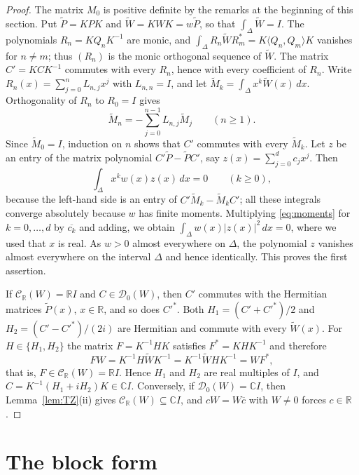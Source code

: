 \documentclass[11pt]{amsart}
\theoremstyle{definition}
\theoremstyle{remark}
\numberwithin{equation}{section}
\newcommand{\C}{\mathbb{C}}
\newcommand{\R}{\mathbb{R}}
\newcommand{\cD}{\mathcal{D}}
\newcommand{\CR}{\mathcal{C}_{\R}}
\newcommand{\ip}[2]{\langle #1,#2\rangle}
\newcommand{\conj}[1]{\overline{#1}}
\begin{document}
\begin{proof}
The matrix $M_0$ is positive definite by the remarks at the beginning of
this section. Put $\widetilde P=KPK$ and $\widetilde W=KWK=w\widetilde P$,
so that $\int_\Delta\widetilde W=I$. The polynomials
$R_n=KQ_nK^{-1}$ are monic, and
$\int_\Delta R_n\widetilde WR_m^*=K\ip{Q_n}{Q_m}K$ vanishes for $n\ne m$;
thus $(R_n)$ is the monic orthogonal sequence of $\widetilde W$. The matrix
$C'=KCK^{-1}$ commutes with every $R_n$, hence with every coefficient of
$R_n$. Write $R_n(x)=\sum_{j=0}^nL_{n,j}x^j$ with $L_{n,n}=I$, and let
$\widetilde M_k=\int_\Delta x^k\widetilde W(x)\,dx$. Orthogonality of $R_n$
to $R_0=I$ gives
\[
\widetilde M_n=-\sum_{j=0}^{n-1}L_{n,j}\widetilde M_j\qquad(n\ge1).
\]
Since $\widetilde M_0=I$, induction on $n$ shows that $C'$ commutes with
every $\widetilde M_k$. Let $z$ be an entry of the matrix polynomial
$C'\widetilde P-\widetilde PC'$, say $z(x)=\sum_{j=0}^dc_jx^j$. Then
\begin{equation}\label{eq:moments}
\int_\Delta x^kw(x)z(x)\,dx=0\qquad(k\ge0),
\end{equation}
because the left-hand side is an entry of
$C'\widetilde M_k-\widetilde M_kC'$; all these integrals converge absolutely
because $w$ has finite moments. Multiplying \eqref{eq:moments} for
$k=0,\dots,d$ by $\conj{c_k}$ and adding, we obtain
$\int_\Delta w(x)\lvert z(x)\rvert^2\,dx=0$, where we used that $x$ is
real. As $w>0$ almost everywhere on $\Delta$, the polynomial $z$ vanishes
almost everywhere on the interval $\Delta$ and hence identically. This
proves the first assertion.

If $\CR(W)=\R I$ and $C\in\cD_0(W)$, then $C'$ commutes with the Hermitian
matrices $\widetilde P(x)$, $x\in\R$, and so does $C'^*$. Both
$H_1=(C'+C'^*)/2$ and $H_2=(C'-C'^*)/(2i)$ are Hermitian and commute with
every $\widetilde W(x)$. For $H\in\{H_1,H_2\}$ the matrix $F=K^{-1}HK$
satisfies $F^*=KHK^{-1}$ and therefore
\[
FW=K^{-1}H\widetilde WK^{-1}=K^{-1}\widetilde WHK^{-1}=WF^*,
\]
that is, $F\in\CR(W)=\R I$. Hence $H_1$ and $H_2$ are real multiples of $I$,
and $C=K^{-1}(H_1+iH_2)K\in\C I$. Conversely, if $\cD_0(W)=\C I$, then
Lemma~\ref{lem:TZ}(ii) gives $\CR(W)\subseteq\C I$, and $cW=W\conj c$ with
$W\ne0$ forces $c\in\R$.
\end{proof}

\section{The block form}\label{sec:block}
\end{document}
